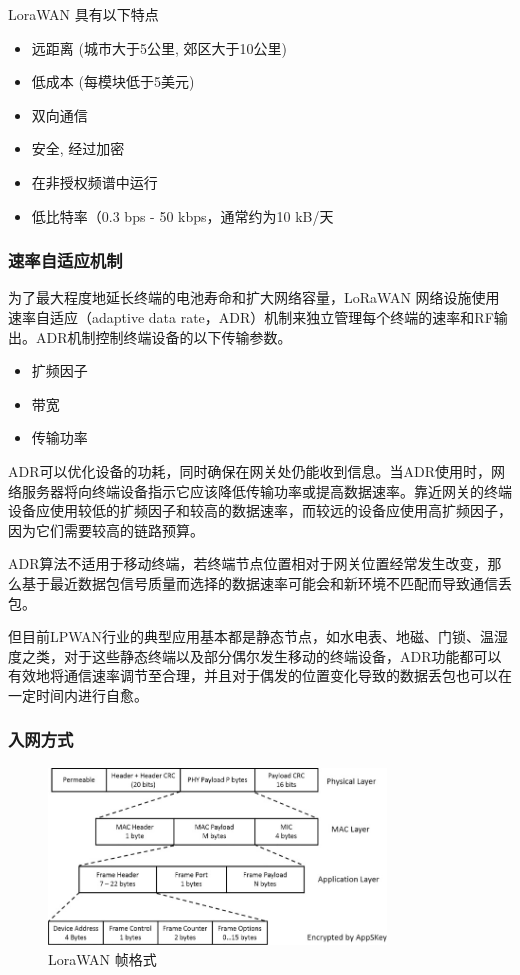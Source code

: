 \documentclass[scheme=chinese,a4paper]{article}
\begin{document}
LoraWAN 具有以下特点
\begin{itemize}
  \item 远距离 (城市大于5公里, 郊区大于10公里)
  \item 低成本 (每模块低于5美元)
  \item 双向通信
  \item 安全, 经过加密
  \item 在非授权频谱中运行
  \item 低比特率（0.3 bps - 50 kbps，通常约为10 kB/天
\end{itemize}
\subsubsection{速率自适应机制}
为了最大程度地延长终端的电池寿命和扩大网络容量，LoRaWAN 网络设施使用速率自适应（adaptive data rate，ADR）机制来独立管理每个终端的速率和RF输出。ADR机制控制终端设备的以下传输参数。
\begin{itemize}
  \item 扩频因子
  \item 带宽
  \item 传输功率
\end{itemize}
ADR可以优化设备的功耗，同时确保在网关处仍能收到信息。当ADR使用时，网络服务器将向终端设备指示它应该降低传输功率或提高数据速率。靠近网关的终端设备应使用较低的扩频因子和较高的数据速率，而较远的设备应使用高扩频因子，因为它们需要较高的链路预算。

ADR算法不适用于移动终端，若终端节点位置相对于网关位置经常发生改变，那么基于最近数据包信号质量而选择的数据速率可能会和新环境不匹配而导致通信丢包。

但目前LPWAN行业的典型应用基本都是静态节点，如水电表、地磁、门锁、温湿度之类，对于这些静态终端以及部分偶尔发生移动的终端设备，ADR功能都可以有效地将通信速率调节至合理，并且对于偶发的位置变化导致的数据丢包也可以在一定时间内进行自愈。
\subsubsection{入网方式}
\begin{figure}[H]
\centering
\includegraphics[width=0.8\textwidth]{lorawan_frame.jpg}
\caption{LoraWAN 帧格式}
\end{figure}
\end{document}
